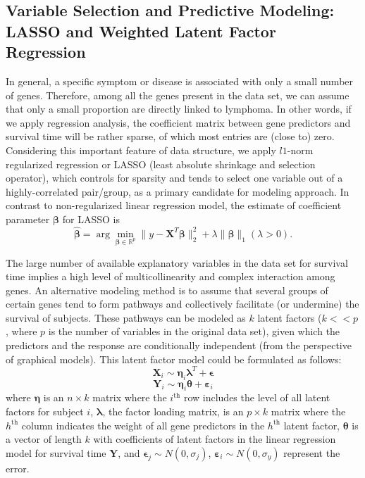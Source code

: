 \documentclass[a4paper]{article}
\begin{document}
\subsection{Variable Selection and Predictive Modeling: LASSO and Weighted Latent Factor Regression}
In general, a specific symptom or disease is associated with only a small number of genes. Therefore, among all the genes present in the data set, we can assume that only a small proportion are directly linked to lymphoma. In other words, if we apply regression analysis, the coefficient matrix between gene predictors and survival time will be rather sparse, of which most entries are (close to) zero. Considering this important feature of data structure, we apply $l1$-norm regularized regression or LASSO (least absolute shrinkage and selection operator), which controls for sparsity and tends to select one variable out of a highly-correlated pair/group, as a primary candidate for modeling approach. In contrast to non-regularized linear regression model, the estimate of coefficient parameter $\bm{\beta}$ for LASSO is $$\hat{\bm{\beta}} = \arg\min_{\bm{\beta} \in \mathbb{R}^{p}}\|y - \mathbf{X}^{T}\bm{\beta}\|_{2}^{2} + \lambda\|\bm{\beta}\|_{1} (\lambda > 0).$$

The large number of available explanatory variables in the data set for survival time implies a high level of multicollinearity and complex interaction among genes. An alternative modeling method is to assume that several groups of certain genes tend to form pathways and collectively facilitate (or undermine) the survival of subjects. These pathways can be modeled as $k$ latent factors ($k << p$, where $p$ is the number of variables in the original data set), given which the predictors and the response are conditionally independent (from the perspective of graphical models). This latent factor model could be formulated as follows:
$$\mathbf{X}_{i} \sim \bm{\eta}_{i}\bm{\lambda}^{T} + \bm{\epsilon}$$
$$\mathbf{Y}_{i} \sim \bm{\eta}_{i}\bm{\theta} + \bm{\varepsilon}_{i}$$
where $\bm{\eta}$ is an $n \times k$ matrix where the $i^{\text{th}}$ row includes the level of all latent factors for subject $i$, $\bm{\lambda}$, the factor loading matrix, is an $p \times k$ matrix where the $h^{\text{th}}$ column indicates the weight of all gene predictors in the $h^{\text{th}}$ latent factor, $\bm{\theta}$ is a vector of length $k$ with coefficients of latent factors in the linear regression model for survival time $\mathbf{Y}$, and $\bm{\epsilon}_{j} \sim N(0, \sigma_{j})$, $\bm{\varepsilon}_{i} \sim N(0, \sigma_{y})$ represent the error.
\end{document}
